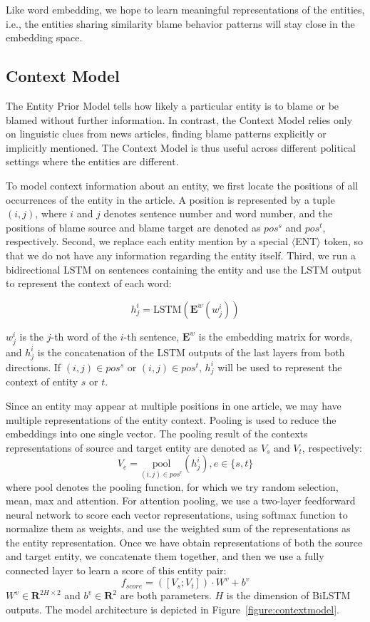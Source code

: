 \documentclass[letterpaper]{article} %
\begin{document}
Like word embedding, we hope to learn meaningful representations of the entities, i.e., the entities sharing similarity blame behavior patterns will stay close in the embedding space.

\subsection{Context Model}
\label{contextmodel}

The Entity Prior Model tells how likely a particular entity is to blame or be blamed without further information. In contrast, the Context Model relies only on linguistic clues from news articles, finding blame patterns explicitly or implicitly mentioned. The Context Model is thus useful across different political settings where the entities are different.

To model context information about an entity, we first locate the positions of all occurrences of the entity in the article. A position is represented by a tuple $(i, j)$, where $i$ and $j$ denotes sentence number and word number, and the positions of blame source and blame target are denoted as $pos^s$ and $pos^t$, respectively. Second, we replace each entity mention by a special $\langle$ENT$\rangle$ token, so that we do not have any information regarding the entity itself. Third, we run a bidirectional LSTM on sentences containing the entity and use the LSTM output to represent the context of each word:

$$h^i_j=\mathrm{LSTM}(\mathbf{E}^w(w^i_j))$$

$w^i_j$ is the $j$-th word of the $i$-th sentence, $\mathbf{E}^w$ is the embedding matrix for words, and $h^i_j$ is the concatenation of the LSTM outputs of the last layers from both directions. If $(i, j) \in pos^s$ or $(i, j) \in pos^t$, $h^i_j$ will be used to represent the context of entity $s$ or $t$.

Since an entity may appear at multiple positions in one article, we may have multiple representations of the entity context. Pooling is used to reduce the embeddings into one single vector. The pooling result of the contexts representations of source and target entity are denoted as $V_s$ and $V_t$, respectively: $$V_e = \underset{(i, j) \in pos^e} {\mathrm{pool}} (h^i_j), e \in \{s, t\}$$where $\mathrm{pool}$ denotes the pooling function, for which we try random selection, mean, max and attention. For attention pooling, we use a two-layer feedforward neural network to score each vector representations, using softmax function to normalize them as weights, and use the weighted sum of the representations as the entity representation. Once we have obtain representations of both the source and target entity, we concatenate them together, and then we use a fully connected layer to learn a score of this entity pair: $$f_{score} = ([V_s; V_t]) \cdot W^v + b^v $$ $W^v \in \mathbf{R}^{2H \times 2}$ and $b^v \in \mathbf{R}^{2}$ are both parameters. $H$ is the dimension of BiLSTM outputs. The model architecture is depicted in Figure~\ref{figure:contextmodel}.
\end{document}
